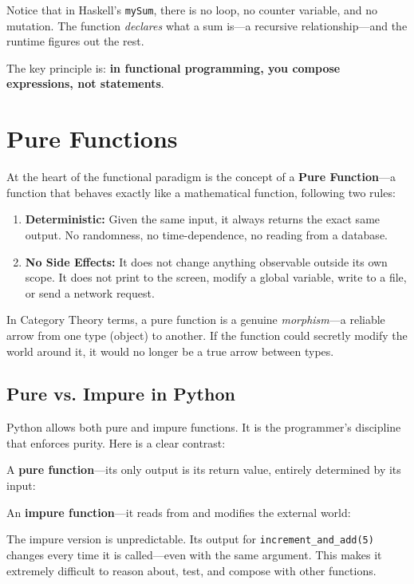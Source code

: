 Notice that in Haskell's \texttt{mySum}, there is no loop, no counter variable, and no mutation. The function \textit{declares} what a sum is---a recursive relationship---and the runtime figures out the rest.

The key principle is: \textbf{in functional programming, you compose expressions, not statements}.

\section{Pure Functions}

At the heart of the functional paradigm is the concept of a \textbf{Pure Function}---a function that behaves exactly like a mathematical function, following two rules:

\begin{enumerate}
    \item \textbf{Deterministic:} Given the same input, it always returns the exact same output. No randomness, no time-dependence, no reading from a database.
    \item \textbf{No Side Effects:} It does not change anything observable outside its own scope. It does not print to the screen, modify a global variable, write to a file, or send a network request.
\end{enumerate}

In Category Theory terms, a pure function is a genuine \textit{morphism}---a reliable arrow from one type (object) to another. If the function could secretly modify the world around it, it would no longer be a true arrow between types.

\subsection{Pure vs. Impure in Python}

Python allows both pure and impure functions. It is the programmer's discipline that enforces purity. Here is a clear contrast:

A \textbf{pure function}---its only output is its return value, entirely determined by its input:


An \textbf{impure function}---it reads from and modifies the external world:


The impure version is unpredictable. Its output for \texttt{increment\_and\_add(5)} changes every time it is called---even with the same argument. This makes it extremely difficult to reason about, test, and compose with other functions.

